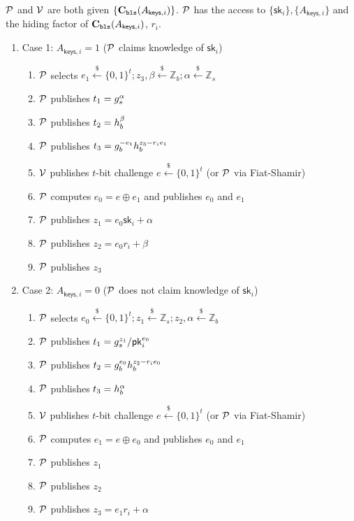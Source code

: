 
\begin{Protocol*}[t!]
\begin{mdframed}
$\mathcal{P}$ and $\mathcal{V}$ are both given $\{\textbf{C}_\texttt{bls}(A_{\mathsf{keys},i})\}$. $\mathcal{P}$ has the access to $\{\mathsf{sk}_i\},\{A_{\mathsf{keys},i}\}$ and the hiding factor of $\textbf{C}_\texttt{bls}(A_{\mathsf{keys},i})$, $r_i$.
\begin{enumerate}   
    \item Case 1: $A_{\mathsf{keys},i}=1$ ($\mathcal{P}$ claims knowledge of $\mathsf{sk}_i$)
    \begin{enumerate}  
        \item $\mathcal{P}$ selects $e_1\stackrel{\$}{\leftarrow} \{0,1\}^t; z_3,\beta\stackrel{\$}{\leftarrow}\mathbb{Z}_b;\alpha\stackrel{\$}{\leftarrow}\mathbb{Z}_s$
        \item $\mathcal{P}$ publishes  $t_1=g_s^\alpha$
        \item $\mathcal{P}$ publishes $t_2=h_b^\beta$
        \item $\mathcal{P}$ publishes  $t_3=g_b^{-e_1}h_b^{z_3-r_ie_1}$
        \item $\mathcal{V}$ publishes $t$-bit challenge $e\stackrel{\$}{\leftarrow} \{0,1\}^t$ (or $\mathcal{P}$ via Fiat-Shamir)
        \item $\mathcal{P}$ computes $e_0=e\oplus{e_1}$ and publishes $e_0$ and $e_1$
        \item $\mathcal{P}$ publishes $z_1=e_0\mathsf{sk}_i+\alpha$
        \item $\mathcal{P}$ publishes $z_2=e_0r_i+\beta$
        \item $\mathcal{P}$ publishes $z_3$
    \end{enumerate}
    
    \item Case 2: $A_{\mathsf{keys},i}=0$ ($\mathcal{P}$ does not claim knowledge of $\mathsf{sk}_i$)
    \begin{enumerate}  
        \item $\mathcal{P}$ selects $e_0\stackrel{\$}{\leftarrow} \{0,1\}^t;z_1\stackrel{\$}{\leftarrow}\mathbb{Z}_s;z_2,\alpha\stackrel{\$}{\leftarrow}\mathbb{Z}_b$
        \item $\mathcal{P}$ publishes $t_1=g_s^{z_1}/\mathsf{pk}_i^{e_0}$
        \item $\mathcal{P}$ publishes $t_2=g_b^{e_0}h_b^{z_2-r_ie_0}$
        \item $\mathcal{P}$ publishes $t_3=h_b^\alpha$
        \item $\mathcal{V}$ publishes $t$-bit challenge $e\stackrel{\$}{\leftarrow} \{0,1\}^t$ (or $\mathcal{P}$ via Fiat-Shamir)
        \item $\mathcal{P}$ computes $e_1=e\oplus{e_0}$ and publishes $e_0$ and $e_1$    
        \item $\mathcal{P}$ publishes $z_1$
        \item $\mathcal{P}$ publishes $z_2$
        \item $\mathcal{P}$ publishes $z_3=e_1r_i+\alpha$
    \end{enumerate}
    

\end{enumerate}
\end{mdframed}
\end{Protocol*}
